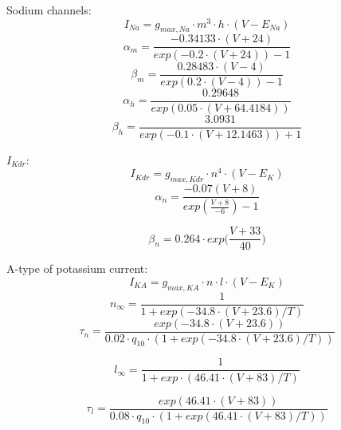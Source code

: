 \documentclass[a4paper,12pt]{article}
\begin{document}
Sodium channels:
\begin{equation}
\label{eq:Navngf}
I_{Na} = g_{max, Na} \cdot m^3 \cdot h \cdot (V - E_{Na})
\end{equation}
\begin{equation}
\alpha_m = \frac{-0.34133 \cdot (V + 24)}{exp(-0.2\cdot(V+24)) - 1}
\end{equation}
\begin{equation}
\beta_m = \frac{0.28483 \cdot (V -4)}{exp(0.2\cdot(V-4)) - 1}
\end{equation}
\begin{equation}
\alpha_h = \frac{0.29648}{exp(0.05\cdot(V+64.4184))}
\end{equation}
\begin{equation}
\beta_h = \frac{3.0931}{exp(-0.1\cdot(V+12.1463)) + 1}
\end{equation}

$I_{Kdr}$:
\begin{equation}
\label{eq:Kdrfastngf}
I_{Kdr} = g_{max, Kdr} \cdot n^4 \cdot (V - E_K)
\end{equation}
\begin{equation}
\alpha_n = \frac{-0.07(V + 8)}{exp(\frac{V + 8}{-6}) - 1}
\end{equation}

\begin{equation}
\beta_n = 0.264 \cdot exp \Big( \frac{V + 33}{40} \Big)
\end{equation}

A-type of potassium current:
\begin{equation}
I_{KA} = g_{max, KA} \cdot n \cdot l \cdot (V - E_K)
\end{equation}
\begin{equation}
n_{\infty} = \frac{1}{1 + exp(-34.8 \cdot (V + 23.6)/T)}
\end{equation}
\begin{equation}
\tau_n = \frac{exp(-34.8 \cdot (V + 23.6)) }
{0.02 \cdot q_{10} \cdot (1 + exp(-34.8 \cdot (V + 23.6)/T))}
\end{equation}

\begin{equation}
l_{\infty} = \frac{1}{1 + exp \cdot (46.41\cdot (V + 83)/T)}
\end{equation}

\begin{equation}
\tau_l = \frac{exp(46.41\cdot (V + 83)) }
{0.08 \cdot q_{10} \cdot (1 + exp(46.41\cdot (V + 83)/T))}
\end{equation}
\end{document}
